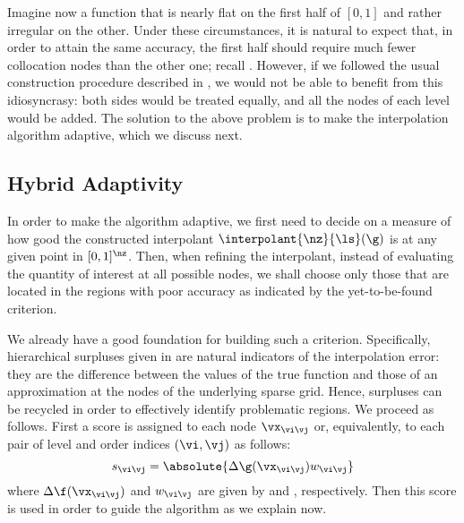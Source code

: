 Imagine now a function that is nearly flat on the first half of $[0, 1]$ and
rather irregular on the other. Under these circumstances, it is natural to
expect that, in order to attain the same accuracy, the first half should require
much fewer collocation nodes than the other one; recall
. However, if we followed the usual construction
procedure described in , we would not be able to
benefit from this idiosyncrasy: both sides would be treated equally, and all the
nodes of each level would be added. The solution to the above problem is to make
the interpolation algorithm adaptive, which we discuss next.

\subsection{Hybrid Adaptivity}

In order to make the algorithm adaptive, we first need to decide on a measure of
how good the constructed interpolant $\interpolant{\nz}{\ls}(\g)$ is at any
given point in $[0, 1]^\nz$. Then, when refining the interpolant, instead of
evaluating the quantity of interest at all possible nodes, we shall choose only
those that are located in the regions with poor accuracy as indicated by the
yet-to-be-found criterion.

We already have a good foundation for building such a criterion. Specifically,
hierarchical surpluses given in  are natural
indicators of the interpolation error: they are the difference between the
values of the true function and those of an approximation at the nodes of the
underlying sparse grid. Hence, surpluses can be recycled in order to effectively
identify problematic regions. We proceed as follows. First a score is assigned
to each node $\vx_{\vi \vj}$ or, equivalently, to each pair of level and order
indices $(\vi, \vj)$ as follows:
\[
  s_{\vi \vj} = \absolute{\Delta\g(\vx_{\vi \vj}) w_{\vi \vj}}
\]
where $\Delta\f(\vx_{\vi \vj})$ and $w_{\vi\vj}$ are given by
 and ,
respectively. Then this score is used in order to guide the algorithm as we
explain now.

